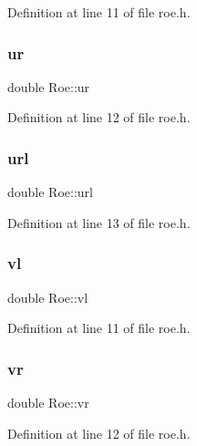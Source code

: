 Definition at line 11 of file roe.\+h.

\mbox{\label{classRoe_ab11ce73f25fa828140bea0f820a74844}} 
\subsubsection{\texorpdfstring{ur}{ur}}
{\footnotesize\ttfamily double Roe\+::ur\hspace{0.3cm}{\ttfamily [private]}}



Definition at line 12 of file roe.\+h.

\mbox{\label{classRoe_affc96152da540e7b72c1fde648ad8ce5}} 
\subsubsection{\texorpdfstring{url}{url}}
{\footnotesize\ttfamily double Roe\+::url\hspace{0.3cm}{\ttfamily [private]}}



Definition at line 13 of file roe.\+h.

\mbox{\label{classRoe_a9c7ca2b690bd235643559386ece348c1}} 
\subsubsection{\texorpdfstring{vl}{vl}}
{\footnotesize\ttfamily double Roe\+::vl\hspace{0.3cm}{\ttfamily [private]}}



Definition at line 11 of file roe.\+h.

\mbox{\label{classRoe_a69d1aa7c0230640c1c0cc50061a6d1d2}} 
\subsubsection{\texorpdfstring{vr}{vr}}
{\footnotesize\ttfamily double Roe\+::vr\hspace{0.3cm}{\ttfamily [private]}}



Definition at line 12 of file roe.\+h.

